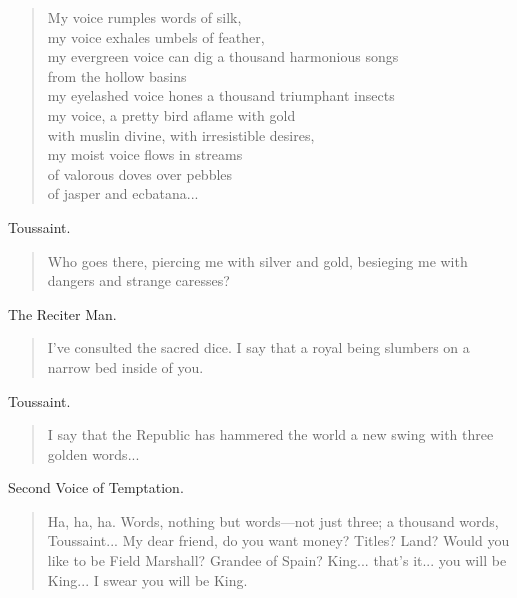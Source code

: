 \documentclass[letterpaper,article,12pt,oneside,notitlepage]{memoir}
\begin{document}
\begin{verse}
My voice rumples words of silk, \\
my voice exhales umbels of feather, \\
my evergreen voice can dig a thousand harmonious songs \\
from the hollow basins \\
my eyelashed voice hones a thousand triumphant insects \\
my voice, a pretty bird aflame with gold \\
with muslin divine, with irresistible desires, \\
my moist voice flows in streams \\
of valorous doves over pebbles \\
of jasper and ecbatana... \\
\end{verse}

\begin{center}Toussaint.\end{center}

\begin{verse}
\indent Who goes there, piercing me with silver and gold, besieging me with dangers and strange caresses? \\
\end{verse}

\begin{center}The Reciter Man.\end{center}

\begin{verse}
\indent I've consulted the sacred dice. I say that a royal being slumbers on a narrow bed inside of you. \\
\end{verse}

\begin{center}Toussaint.\end{center}

\begin{verse}
\indent I say that the Republic has hammered the world a new swing with three golden words... \\
\end{verse}

\begin{center}Second Voice of Temptation.\end{center}

\begin{verse}
\indent Ha, ha, ha. Words, nothing but words---not just three; a thousand words, Toussaint... My dear friend, do you want money? Titles? Land? Would you like to be Field Marshall? Grandee of Spain? King... that's it... you will be King... I swear you will be King. \\
\end{verse}
\end{document}
